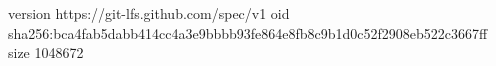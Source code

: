 version https://git-lfs.github.com/spec/v1
oid sha256:bca4fab5dabb414cc4a3e9bbbb93fe864e8fb8c9b1d0c52f2908eb522c3667ff
size 1048672
